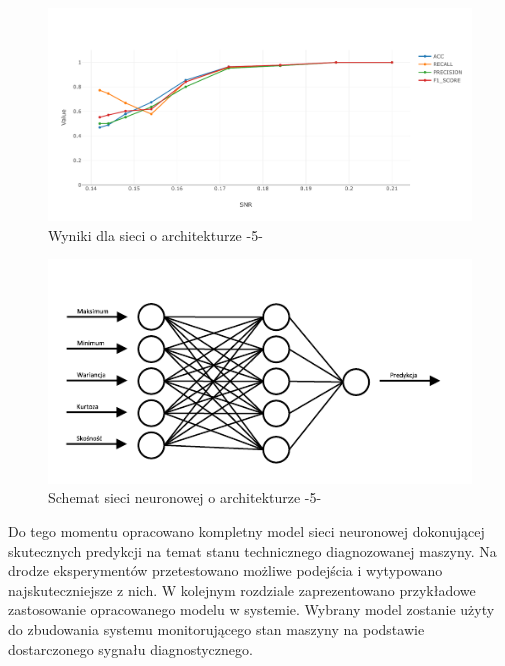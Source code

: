 \documentclass[inzynierska]{pwr_wmat_praca_dyplomowa}
\theoremstyle{plain}
\numberwithin{theorem}{chapter}
\theoremstyle{definition}
\numberwithin{theorem}{chapter}
\begin{document}
\begin{figure}[ht]
	\centering
	\includegraphics[width=14cm]{images/snr_to_acc5.pdf}
	\caption{Wyniki dla sieci o architekturze -5-}
	\label{wynik-est-5}
\end{figure}

\begin{figure}[H]
	\centering
	\includegraphics[scale=1.5]{images/final_model_c.pdf}
	\caption{Schemat sieci neuronowej o architekturze -5-}
	\label{final_model}
\end{figure}

Do tego momentu opracowano kompletny model sieci neuronowej dokonującej skutecznych predykcji na temat stanu technicznego diagnozowanej maszyny. Na drodze eksperymentów przetestowano możliwe podejścia i wytypowano najskuteczniejsze z nich. W kolejnym rozdziale zaprezentowano przykładowe zastosowanie opracowanego modelu w systemie. Wybrany model zostanie użyty do zbudowania systemu monitorującego stan maszyny na podstawie dostarczonego sygnału diagnostycznego. 
\end{document}
